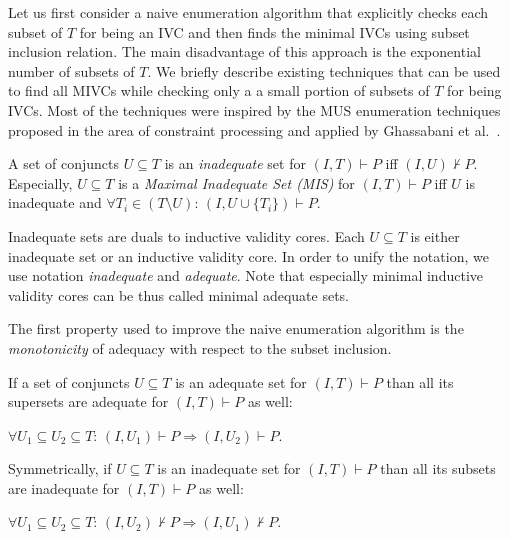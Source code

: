 \newcommand{\fUnex}{f_{\mathit{Unexplored}}}
Let us first consider
a naive enumeration algorithm that   explicitly checks each subset of $T$ for being an IVC  and then finds the minimal IVCs  using subset inclusion relation. The main disadvantage of this approach is the   exponential number of subsets of $T$.
We briefly describe existing techniques that can be used to find all MIVCs while checking only a a small portion of subsets of $T$  for being IVCs.  Most of the techniques were inspired by the MUS enumeration techniques~\cite{}   proposed in the area of constraint processing and applied by Ghassabani et al.~\cite{}.






\begin{definition}[Inadequacy] A set of conjuncts  $U \subseteq T$  is an \emph{inadequate} set for $(I, T) \vdash P$ iff $(I, U) \nvdash P$. Especially, $U \subseteq T$ is a \emph{Maximal Inadequate Set (MIS)} for $(I, T) \vdash P$ iff $U$ is inadequate and $\forall T_i \in (T \setminus U): \, (I, U \cup \{ T_i\}) \vdash P$.
\end{definition}

Inadequate sets are duals to inductive validity cores. Each $U \subseteq T$ is either inadequate set or an inductive validity core. In order to unify the notation, we   use notation \emph{inadequate} and \emph{adequate}. Note that especially minimal inductive validity cores can be thus called  minimal adequate sets.



The first property used to improve the naive enumeration algorithm is the \emph{monotonicity} of  adequacy   with respect to the subset inclusion.

\begin{lemma}[Monotonicity]
\label{lemma:monotonicity}
If a set of conjuncts  $U \subseteq T$  is an adequate set for $(I, T) \vdash P$   than all its supersets are adequate for  $(I, T) \vdash P$ as well:
\begin{center}
$\forall U_1 \subseteq U_2 \subseteq T: \, (I, U_1) \vdash P \Rightarrow (I, U_2) \vdash P$.
\end{center}
Symmetrically, if   $U \subseteq T$  is an inadequate set for $(I, T) \vdash P$   than all its subsets are inadequate for  $(I, T) \vdash P$ as well:
\begin{center}
$\forall U_1 \subseteq U_2 \subseteq T: \, (I, U_2) \nvdash P \Rightarrow (I, U_1) \nvdash P$.
\end{center}
\end{lemma}

